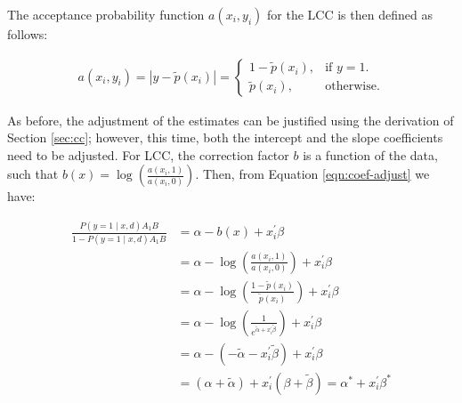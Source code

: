 The acceptance probability function $a(x_i, y_i)$ for the LCC is then defined as follows:

\begin{align}
  a(x_i,y_i)=|y-\text{$\tilde{p}(x_i)$}|=
  \begin{cases}
    1-\text{$\tilde{p}(x_i)$}, & \text{if $y=1$}.\\
    \text{$\tilde{p}(x_i)$}, & \text{otherwise}.
  \end{cases}
  \label{eqn:prob-function-lcc}
\end{align}

As before, the adjustment of the estimates can be justified using the derivation of Section \ref{sec:cc}; however, this time, both the intercept and the slope coefficients need to be adjusted. For LCC, the correction factor $b$ is a function of the data, such that $b(x) = \log \left(\frac{a(x_i,1)}{a(x_i,0)} \right)$. Then, from Equation \ref{eqn:coef-adjust} we have:

\begin{align}
    \nonumber \frac{P(y=1 \mid x, d) A_1 B}{1 - P(y=1 \mid x, d) A_1 B} &= \alpha - b(x) + x_i^{\prime} \beta \\
    \nonumber &= \alpha - \log \left(\frac{a(x_i,1)}{a(x_i,0)}\right) + x_i^{\prime} \beta \\ 
    \nonumber &= \alpha - \log \left(\frac{1-\tilde{p}(x_i)}{\tilde{p}(x_i)}\right) + x_i^{\prime} \beta \\
    \nonumber &= \alpha - \log \left(\frac{1}{e^{\tilde{\alpha} + x_i^{\prime} \tilde{\beta}}}\right) + x_i^{\prime} \beta \\
    \nonumber &= \alpha - (-\tilde{\alpha} - x_i^{\prime} \tilde{\beta}) + x_i^{\prime} \beta \\
    &= (\alpha + \tilde{\alpha}) +  x_i^{\prime} (\beta + \tilde{\beta}) = \alpha^* + x_i^{\prime} \beta^*
    \label{eqn:lcc-adjustment}
\end{align}


